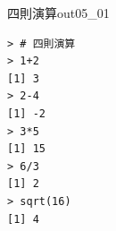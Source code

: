 \begin{Rscreen}{四則演算}{out05_01}
	\begin{verbatim}
> # 四則演算
> 1+2
[1] 3
> 2-4
[1] -2
> 3*5
[1] 15
> 6/3
[1] 2
> sqrt(16)
[1] 4
\end{verbatim}
\end{Rscreen}
